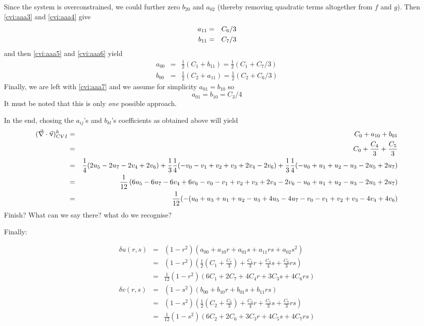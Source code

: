Since the system is overconstrained, we could further  
zero $b_{20}$ and $a_{02}$ (thereby removing quadratic terms altogether from $f$ and $g$). 
Then  \eqref{cvi:aaa3} and \eqref{cvi:aaa4} give
\begin{eqnarray}
a_{11} &=& C_6/3 \nonumber\\
b_{11} &=& C_7/3 \nonumber
\end{eqnarray}
and then  \eqref{cvi:aaa5} and \eqref{cvi:aaa6} yield 
\begin{eqnarray}
a_{00} &=& \frac12 (C_1+b_{11}) = \frac12 (C_1 + C_7/3) \nonumber\\
b_{00} &=& \frac12 (C_2+a_{11}) = \frac12 (C_2 + C_6/3) \nonumber
\end{eqnarray}
Finally, we are left with \eqref{cvi:aaa7} and we assume for simplicity $a_{01}=b_{10}$ so 
\[
a_{01}=b_{10}=C_3/4
\]
It must be noted that this is only {\it one} possible approach. 

In the end, chosing the $a_{ij}$'s and $b_{kl}$'s coefficients as obtained above will yield
\begin{eqnarray}
(\vec\nabla\cdot\vec\upnu)^h_{CVI} 
&=& C_0 + a_{10} + b_{01} \nonumber\\ 
&=& C_0 + \frac{C_4}{3} + \frac{C_5}{3} \nonumber\\
&=& 
\frac{1}{4}(2u_5 -2u_7 -2v_4 +2v_6)  
+\frac13\frac{1}{4}(-v_0 -v_1 +v_2 +v_3 +2v_4 -2v_6 ) 
+\frac13\frac{1}{4}(-u_0 + u_1 +u_2 -u_3 -2u_5 +2u_7) \nonumber \\
&=&  
\frac{1}{12}\left(6u_5 -6u_7 -6v_4 +6v_6  
-v_0 -v_1 +v_2 +v_3 +2v_4 -2v_6  
-u_0 + u_1 +u_2 -u_3 -2u_5 +2u_7 \right) \nonumber \\
&=& \frac{1}{12}(-(u_0+u_3    +u_1+u_2 -u_3 + 4u_5 -4u_7  -v_0-v_1+v_2+v_3  -4v_4 +4v_6    ) \nonumber 
\end{eqnarray}
Finish? What can we say there? what do we recognise?

Finally:

\begin{eqnarray}
\delta u(r,s) 
&=& (1-r^2) (a_{00} + a_{10} r + a_{01} s + a_{11} rs + a_{02} s^2) \nonumber\\
&=& (1-r^2) \left(\frac12 (C_1 + \frac{C_7}{3})  + \frac{C_4}{3} r + \frac{C_3}{4}  s 
+ \frac{C_6}{3} rs \right) \nonumber\\
&=& \frac{1}{12} (1-r^2) ( 6C_1 + 2C_7 + 4C_4 r+ 3C_3s + 4C_6 rs   ) \nonumber\\
\delta v(r,s) 
&=& (1-s^2) (b_{00} + b_{10} r + b_{01} s + b_{11} rs ) \nonumber\\
&=& (1-s^2) \left(\frac12 (C_2 + \frac{C_6}{3}) + \frac{C_3}{4} r + \frac{C_5}{3}s + \frac{C_7}{3} rs \right) \nonumber\\
&=& \frac{1}{12} (1-s^2) \left(6 C_2 + 2 C_6 + 3 C_3 r + 4 C_5s + 4 C_7 rs \right) \nonumber
\end{eqnarray}

